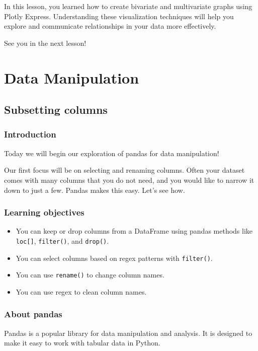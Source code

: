 \documentclass[
  letterpaper,
  DIV=11,
  numbers=noendperiod]{scrreprt}
\providecommand{\tightlist}{%
  \setlength{\itemsep}{0pt}\setlength{\parskip}{0pt}}\usepackage{longtable,booktabs,array}
\begin{document}
In this lesson, you learned how to create bivariate and multivariate
graphs using Plotly Express. Understanding these visualization
techniques will help you explore and communicate relationships in your
data more effectively.

See you in the next lesson!

\part{Data Manipulation}

\chapter{Subsetting columns}\label{subsetting-columns}

\section{Introduction}\label{introduction-6}

Today we will begin our exploration of pandas for data manipulation!

Our first focus will be on selecting and renaming columns. Often your
dataset comes with many columns that you do not need, and you would like
to narrow it down to just a few. Pandas makes this easy. Let's see how.

\section{Learning objectives}\label{learning-objectives-7}

\begin{itemize}
\tightlist
\item
  You can keep or drop columns from a DataFrame using pandas methods
  like \texttt{loc{[}{]}}, \texttt{filter()}, and \texttt{drop()}.
\item
  You can select columns based on regex patterns with \texttt{filter()}.
\item
  You can use \texttt{rename()} to change column names.
\item
  You can use regex to clean column names.
\end{itemize}

\section{About pandas}\label{about-pandas}

Pandas is a popular library for data manipulation and analysis. It is
designed to make it easy to work with tabular data in Python.
\end{document}

